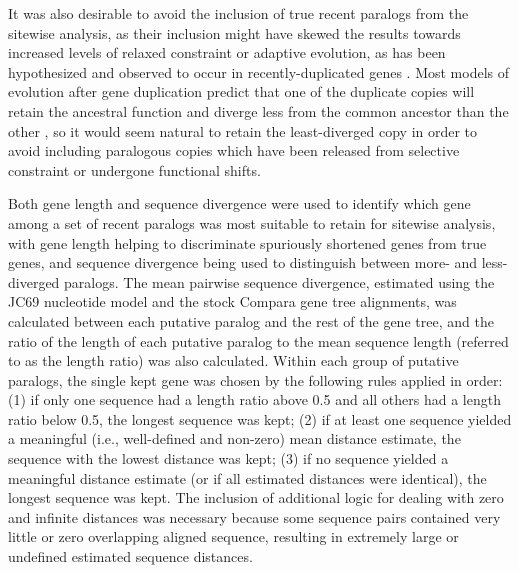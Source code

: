 It was also desirable to avoid the inclusion of true recent paralogs
from the sitewise analysis, as their inclusion might have skewed the
results towards increased levels of relaxed constraint or adaptive
evolution, as has been hypothesized and observed to occur in
recently-duplicated genes \citep{Lynch2000}. Most models of evolution
after gene duplication predict that one of the duplicate copies will
retain the ancestral function and diverge less from the common
ancestor than the other \citep{Han2009}, so it would seem natural to
retain the least-diverged copy in order to avoid including paralogous
copies which have been released from selective constraint or undergone
functional shifts.

Both gene length and sequence divergence were used to identify which
gene among a set of recent paralogs was most suitable to retain for
sitewise analysis, with gene length helping to discriminate spuriously
shortened genes from true genes, and sequence divergence being used to
distinguish between more- and less-diverged paralogs. The mean
pairwise sequence divergence, estimated using the JC69 nucleotide
model and the stock Compara gene tree alignments, was calculated
between each putative paralog and the rest of the gene tree, and the
ratio of the length of each putative paralog to the mean sequence
length (referred to as the length ratio) was also calculated. Within
each group of putative paralogs, the single kept gene was chosen by
the following rules applied in order: (1) if only one sequence had a
length ratio above 0.5 and all others had a length ratio below 0.5,
the longest sequence was kept; (2) if at least one sequence yielded a
meaningful (i.e., well-defined and non-zero) mean distance estimate,
the sequence with the lowest distance was kept; (3) if no sequence
yielded a meaningful distance estimate (or if all estimated distances
were identical), the longest sequence was kept. The inclusion of
additional logic for dealing with zero and infinite distances was
necessary because some sequence pairs contained very little or zero
overlapping aligned sequence, resulting in extremely large or
undefined estimated sequence distances.

